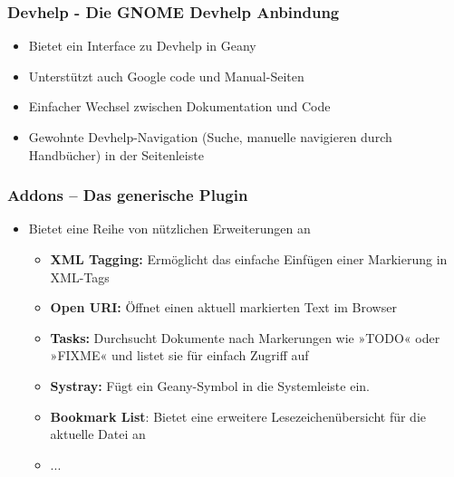 \begin{frame}
    \frametitle{Devhelp - Die GNOME Devhelp Anbindung}
    \begin{block}{}
        \begin{itemize}
            \item Bietet ein Interface zu Devhelp in Geany
            \item Unterstützt auch Google code und Manual-Seiten
            \item Einfacher Wechsel zwischen Dokumentation und Code
            \item Gewohnte Devhelp-Navigation (Suche, manuelle navigieren
                  durch Handbücher) in der Seitenleiste
        \end{itemize}
    \end{block}
\end{frame}

\begin{frame}
    \frametitle{Addons -- Das generische Plugin}
    \begin{block}{}
        \begin{itemize}
            \item Bietet eine Reihe von nützlichen Erweiterungen an
            \begin{itemize}
                \item \textbf{XML Tagging:} Ermöglicht das einfache Einfügen
                      einer Markierung in XML-Tags
                \item \textbf{Open URI:} Öffnet einen aktuell markierten
                      Text im Browser
                \item \textbf{Tasks:} Durchsucht Dokumente nach Markerungen
                      wie »TODO« oder »FIXME« und listet sie für einfach
                      Zugriff auf
                \item \textbf{Systray:} Fügt ein Geany-Symbol in die
                      Systemleiste ein.
                \item \textbf{Bookmark List}: Bietet eine erweitere
                      Lesezeichenübersicht für die aktuelle Datei an
                \item ...
            \end{itemize}
        \end{itemize}
    \end{block}
\end{frame}
